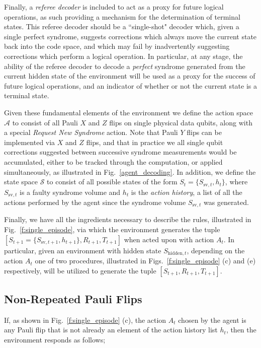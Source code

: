 \documentclass[twocolumn,preprintnumbers,amsmath,amssymb,notitlepage,nofootinbib,longbibliography,superscriptaddress,aps,pra,10pt]{revtex4-1}
\begin{document}
	Finally, a \emph{referee decoder} is included to act as a proxy for future logical operations, as such providing a mechanism for the determination of terminal states.
	This referee decoder should be a ``single-shot" decoder which, given a single perfect syndrome, suggests corrections which always move the current state back into the code space, and which may fail by inadvertently suggesting corrections which perform a logical operation.
	In particular, at any stage, the ability of the referee decoder to decode a \emph{perfect} syndrome generated from the current hidden state of the environment will be used as a proxy for the success of future logical operations, and an indicator of whether or not the current state is a terminal state.

	Given these fundamental elements of the environment we define the action space $\mathcal{A}$ to consist of all Pauli $X$ and $Z$ flips on single physical data qubits, along with a special \emph{Request New Syndrome} action.
	Note that Pauli $Y$ flips can be implemented via $X$ and $Z$ flips, and that in practice we all single qubit corrections suggested between successive syndrome measurements would be accumulated, either to be tracked through the computation, or applied simultaneously, as illustrated in Fig.~\ref{agent_decoding}.
	In addition, we define the state space $\mathcal{S}$ to consist of all possible states of the form $S_{t} = \{S_{\mathrm{sv},t},h_t\}$, where $S_{\mathrm{sv},t}$ is a faulty syndrome volume and $h_t$ is the \emph{action history}, a list of all the actions performed by the agent since the syndrome volume $S_{\mathrm{sv},t}$ was generated.

	Finally, we have all the ingredients necessary to describe the rules, illustrated in Fig.~\ref{f:single_episode}, via which the environment generates the tuple $[S_{t+1} = \{S_{\mathrm{sv},t+1},h_{t+1}\},R_{t+1},T_{t+1}]$ when acted upon with action $A_t$.
	In particular, given an environment with hidden state $S_{\mathrm{hidden},t}$, depending on the action $A_t$ one of two procedures, illustrated in Figs.~\ref{f:single_episode} (c) and (e) respectively, will be utilized to generate the tuple $[S_{t+1},R_{t+1},T_{t+1}]$.

	\subsection{Non-Repeated Pauli Flips}\label{s:non-repeated}

	If, as shown in Fi{}g.~\ref{f:single_episode} (c), the action $A_t$ chosen by the agent is any Pauli flip that is not already an element of the action history list $h_t$, then the environment responds as follows;
\end{document}
